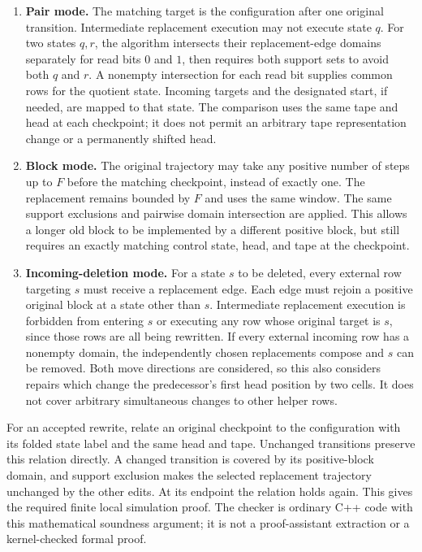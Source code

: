 \begin{enumerate}
\item \textbf{Pair mode.}  The matching target is the configuration after
one original transition.  Intermediate replacement execution may not
execute state $q$.  For two states $q,r$, the algorithm intersects their
replacement-edge domains separately for read bits $0$ and $1$, then
requires both support sets to avoid both $q$ and $r$.  A nonempty
intersection for each read bit supplies common rows for the quotient
state.  Incoming targets and the designated start, if needed, are
mapped to that state.  The comparison uses the same tape and head at
each checkpoint; it does not permit an arbitrary tape representation
change or a permanently shifted head.

\item \textbf{Block mode.}  The original trajectory may take any positive
number of steps up to $F$ before the matching checkpoint, instead of
exactly one.  The replacement remains bounded by $F$ and uses the same
window.  The same support exclusions and pairwise domain intersection
are applied.  This allows a longer old block to be implemented by a
different positive block, but still requires an exactly matching
control state, head, and tape at the checkpoint.

\item \textbf{Incoming-deletion mode.}  For a state $s$ to be deleted,
every external row targeting $s$ must receive a replacement edge.
Each edge must rejoin a positive original block at a state other than
$s$.  Intermediate replacement execution is forbidden from entering
$s$ or executing any row whose original target is $s$, since those
rows are all being rewritten.  If every external incoming row has a
nonempty domain, the independently chosen replacements compose and
$s$ can be removed.  Both move directions are considered, so this
also considers repairs which change the predecessor's first head
position by two cells.  It does not cover arbitrary simultaneous
changes to other helper rows.
\end{enumerate}

For an accepted rewrite, relate an original checkpoint to the
configuration with its folded state label and the same head and tape.
Unchanged transitions preserve this relation directly.  A changed
transition is covered by its positive-block domain, and support
exclusion makes the selected replacement trajectory unchanged by the
other edits.  At its endpoint the relation holds again.  This gives
the required finite local simulation proof.  The checker is ordinary
C++ code with this mathematical soundness argument; it is not a
proof-assistant extraction or a kernel-checked formal proof.

